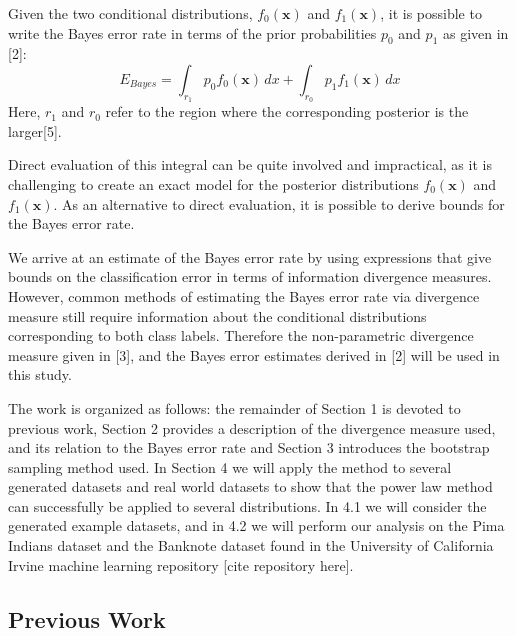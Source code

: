 \documentclass{article}
\begin{document}
		Given the two conditional distributions, $f_0(\textbf{x})$ and $f_1(\textbf{x})$, it is possible to write the Bayes error rate in terms of the prior probabilities $p_0$ and $p_1$ as given in [2]:
		\begin{equation} E_{Bayes}=\int_{r_1} p_0f_0(\textbf{x}) \,dx + \int_{r_0} p_1f_1(\textbf{x}) \,dx	\end{equation}
		Here, $r_1$ and $r_0$ refer to the region where the corresponding posterior is the larger[5].
		
		
		Direct evaluation of this integral can be quite involved and impractical, as it is challenging to create an exact model for the posterior distributions $f_0(\textbf{x})$ and $f_1(\textbf{x})$. As an alternative to direct evaluation, it is possible to derive bounds for the Bayes error rate.
		
		
		We arrive at an estimate of the Bayes error rate by using expressions that give bounds on the classification error in terms of information divergence measures. However, common methods of estimating the Bayes error rate via divergence measure still require information about the conditional distributions corresponding to both class labels. Therefore the non-parametric divergence measure given in [3], and the Bayes error estimates derived in [2] will be used in this study.     
		
		
		The work is organized as follows: the remainder of Section 1 is devoted to previous work, Section 2 provides a description of the divergence measure used, and its relation to the Bayes error rate and Section 3 introduces the bootstrap sampling method used. In Section 4 we will apply the method to several generated datasets and real world datasets to show that the power law method can successfully be applied to several distributions. In 4.1 we will consider the generated example datasets, and in 4.2 we will perform our analysis on the Pima Indians dataset and the Banknote dataset found in the University of California Irvine machine learning repository [cite repository here].
		
		
		
		\subsection*{\small Previous Work}	
		
		
\end{document}
